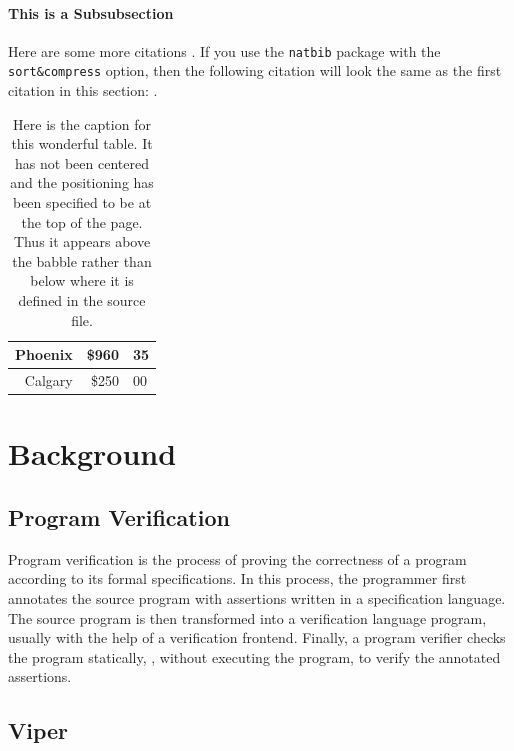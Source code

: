 \documentclass[msc,oneside]{ubcthesis}
\theoremstyle{definition}
\begin{document}
\subsubsection{This is a Subsubsection}
Here are some more citations \cite{LL3:1977,Peccei:1989,Turner:1999}.
If you use the \texttt{natbib} package with the \verb+sort&compress+
option, then the following citation will look the same as the first
citation in this section: \cite{Turner:1999,Peccei:1989,LL3:1977}.


\begin{table}[t]                 %
  \begin{tabular}{|r||r@{.}l|}
    \hline
    Phoenix & \$960&35\\
    \hline
    Calgary & \$250&00\\
    \hline
  \end{tabular}
  \caption[Here is the caption for this wonderful table\ldots]{
    \label{tab:Table1}
    Here is the caption for this wonderful table. It has not been
    centered and the positioning has been specified to be at the top
    of the page.  Thus it appears above the babble rather than below
    where it is defined in the source file.}
\end{table}

\newpage

\chapter{Background}

\section{Program Verification}

Program verification is the process of proving the correctness of a program according to its formal specifications. In this process, the programmer first annotates the source program with assertions written in a specification language. The source program is then transformed into a verification language program, usually with the help of a verification frontend. Finally, a program verifier checks the program statically, \ie, without executing the program, to verify the annotated assertions.

\section{Viper}
\end{document}
